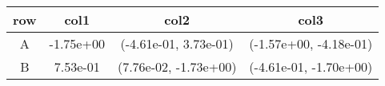 \begin{tabular}{cccc}
\toprule
row&col1&col2&col3\tabularnewline
\midrule
A&-1.75e+00& (-4.61e-01, 3.73e-01)& (-1.57e+00, -4.18e-01)\tabularnewline
B&7.53e-01& (7.76e-02, -1.73e+00)& (-4.61e-01, -1.70e+00)\tabularnewline
\bottomrule
\end{tabular}
